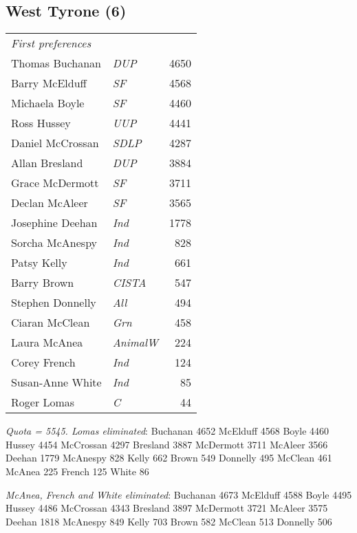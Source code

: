 \begin{resultsiii}
\end{resultsiii}\vfill\eject\begin{resultsiii}

\subsection*{West Tyrone (6)}


\noindent
\begin{tabular*}{\columnwidth}{@{\extracolsep{\fill}} p{} >{\itshape}l r @{\extracolsep{\fill}}}
	\emph{First preferences}\\
	Thomas Buchanan & DUP & 4650\\
	Barry McElduff & SF & 4568\\
	Michaela Boyle & SF & 4460\\
	Ross Hussey & UUP & 4441\\
	Daniel McCrossan & SDLP & 4287\\
	Allan Bresland & DUP & 3884\\
	Grace McDermott & SF & 3711\\
	Declan McAleer & SF & 3565\\
	Josephine Deehan & Ind & 1778\\
	Sorcha McAnespy & Ind & 828\\
	Patsy Kelly & Ind & 661\\
	Barry Brown & CISTA & 547\\
	Stephen Donnelly & All & 494\\
	Ciaran McClean & Grn & 458\\
	Laura McAnea & AnimalW & 224\\
	Corey French & Ind & 124\\
	Susan-Anne White & Ind & 85\\
	Roger Lomas & C & 44\\
\end{tabular*}

\emph{Quota = 5545.  Lomas eliminated}: Buchanan 4652 McElduff 4568 Boyle 4460 Hussey 4454 McCrossan 4297 Bresland 3887 McDermott 3711 McAleer 3566 Deehan 1779 McAnespy 828 Kelly 662 Brown 549 Donnelly 495 McClean 461 McAnea 225 French 125 White 86

\emph{McAnea, French and White eliminated}: Buchanan 4673 McElduff 4588 Boyle 4495 Hussey 4486 McCrossan 4343 Bresland 3897 McDermott 3721 McAleer 3575 Deehan 1818 McAnespy 849 Kelly 703 Brown 582 McClean 513 Donnelly 506


\end{resultsiii}
